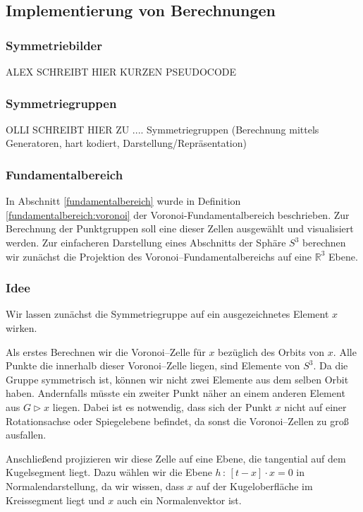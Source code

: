 \subsection{Implementierung von Berechnungen}
    \subsubsection{Symmetriebilder}
        ALEX SCHREIBT HIER KURZEN PSEUDOCODE    
    \subsubsection{Symmetriegruppen}
        OLLI SCHREIBT HIER ZU .... Symmetriegruppen (Berechnung mittels Generatoren, hart kodiert, Darstellung/Repräsentation)
    \subsubsection{Fundamentalbereich}
         In Abschnitt \ref{fundamentalbereich} wurde in Definition \ref{fundamentalbereich:voronoi} der Voronoi-Fundamentalbereich beschrieben. Zur Berechnung der Punktgruppen soll eine dieser Zellen ausgewählt und visualisiert werden.
         Zur einfacheren Darstellung eines Abschnitts der Sphäre $S^3$ berechnen wir zunächst die Projektion des Voronoi--Fundamentalbereichs auf eine $\mathbb{R}^3$ Ebene.
        \subsubsection*{Idee}
            Wir lassen zunächst die Symmetriegruppe auf ein ausgezeichnetes Element $x$ wirken.

            Als erstes Berechnen wir die Voronoi--Zelle für $x$ bezüglich des Orbits von $x$. Alle Punkte die innerhalb dieser Voronoi--Zelle liegen, sind Elemente von $S^3$. 
            Da die Gruppe symmetrisch ist, können wir nicht zwei Elemente aus dem selben Orbit haben. 
            Andernfalls müsste ein zweiter Punkt näher an einem anderen Element aus $G \rhd x$ liegen.
            Dabei ist es notwendig, dass sich der Punkt $x$ nicht auf einer Rotationsachse oder Spiegelebene befindet, da sonst die Voronoi--Zellen zu groß ausfallen.
            
            Anschließend projizieren wir diese Zelle auf eine Ebene, die tangential auf dem Kugelsegment liegt. Dazu wählen wir die Ebene $h \, : \, [t - x] \cdot x = 0$ in Normalendarstellung, da wir wissen, dass $x$ auf der Kugeloberfläche im Kreissegment liegt und $x$ auch ein Normalenvektor ist.
            
